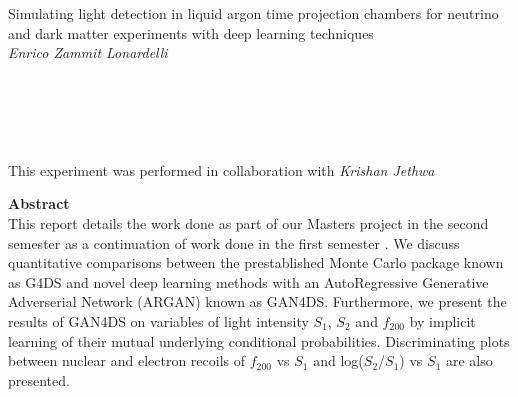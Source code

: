 \documentclass[11pt]{article} %
\begin{document}



\begin{center} %

{\Huge Simulating light detection in liquid argon time projection chambers for neutrino and dark matter experiments with deep learning techniques}\\[0.5cm] %
\vspace{5mm}
\textit{Enrico Zammit Lonardelli}
\\
\vspace{5mm}
\\
\vspace{5mm}
\\
\vspace{5mm}
\\
\vspace{5mm}
\\
\vspace{5mm}
\\
\vspace{5mm}
This experiment was performed in collaboration with \textit{Krishan Jethwa}\\[0.3cm] %

\end{center}
\vspace{60mm}
{\Large \textbf{Abstract}}
\vspace{2mm}
\\
This report details the work done as part of our Masters project in the second semester as a continuation of work done in the first semester \cite{firstsemester}.
We discuss quantitative comparisons between the prestablished Monte Carlo package known as G4DS and novel deep learning methods with an AutoRegressive Generative
Adverserial Network (ARGAN) known as GAN4DS.
Furthermore, we present the results of GAN4DS on variables of light intensity $S_1$, $S_2$
 and $f_{200}$ by implicit learning of their mutual underlying conditional probabilities.
Discriminating plots between nuclear and electron recoils of $f_{200}$ vs $S_1$ and log($S_2$/$S_1$) vs $S_1$ are also presented.
\end{document}
